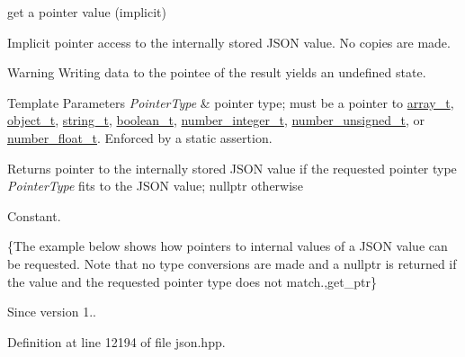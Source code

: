 get a pointer value (implicit) 

Implicit pointer access to the internally stored J\+S\+ON value. No copies are made.

\begin{DoxyWarning}{Warning}
Writing data to the pointee of the result yields an undefined state.
\end{DoxyWarning}

\begin{DoxyTemplParams}{Template Parameters}
{\em Pointer\+Type} & pointer type; must be a pointer to \hyperlink{classnlohmann_1_1basic__json_ae095578e03df97c5b3991787f1056374}{array\+\_\+t}, \hyperlink{classnlohmann_1_1basic__json_a5e48a7893520e1314bf0c9723e26ea2a}{object\+\_\+t}, \hyperlink{classnlohmann_1_1basic__json_a61f8566a1a85a424c7266fb531dca005}{string\+\_\+t}, \hyperlink{classnlohmann_1_1basic__json_a4c919102a9b4fe0d588af64801436082}{boolean\+\_\+t}, \hyperlink{classnlohmann_1_1basic__json_a98e611d67b7bd75307de99c9358ab2dc}{number\+\_\+integer\+\_\+t}, \hyperlink{classnlohmann_1_1basic__json_ab906e29b5d83ac162e823ada2156b989}{number\+\_\+unsigned\+\_\+t}, or \hyperlink{classnlohmann_1_1basic__json_a88d6103cb3620410b35200ee8e313d97}{number\+\_\+float\+\_\+t}. Enforced by a static assertion.\\
\hline
\end{DoxyTemplParams}
\begin{DoxyReturn}{Returns}
pointer to the internally stored J\+S\+ON value if the requested pointer type {\itshape Pointer\+Type} fits to the J\+S\+ON value; {\ttfamily nullptr} otherwise
\end{DoxyReturn}
Constant.

\{The example below shows how pointers to internal values of a J\+S\+ON value can be requested. Note that no type conversions are made and a {\ttfamily nullptr} is returned if the value and the requested pointer type does not match.,get\+\_\+ptr\}

\begin{DoxySince}{Since}
version 1.. 
\end{DoxySince}


Definition at line 12194 of file json.\+hpp.


